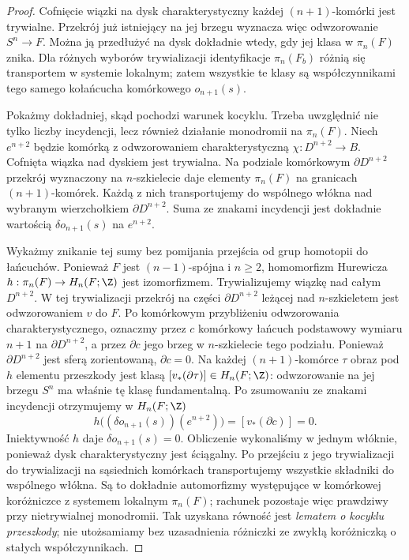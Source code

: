 \begin{proof}
Cofnięcie wiązki na dysk charakterystyczny każdej
$(n+1)$-komórki jest trywialne. Przekrój już istniejący
na jej brzegu wyznacza więc odwzorowanie $S^n\to F$.
Można ją przedłużyć na dysk dokładnie wtedy, gdy
jej klasa w $\pi_n(F)$ znika.
Dla różnych wyborów trywializacji identyfikacje
$\pi_n(F_b)$ różnią się transportem w systemie lokalnym;
zatem wszystkie te klasy są współczynnikami tego samego
kołańcucha komórkowego $o_{n+1}(s)$.

Pokażmy dokładniej, skąd pochodzi warunek kocyklu.
Trzeba uwzględnić nie tylko liczby incydencji,
lecz również działanie monodromii na $\pi_n(F)$.
Niech $e^{n+2}$ będzie komórką z odwzorowaniem
charakterystyczną $\chi:D^{n+2}\to B$.
Cofnięta wiązka nad dyskiem jest trywialna.
Na podziale komórkowym $\partial D^{n+2}$ przekrój
wyznaczony na $n$-szkielecie daje elementy
$\pi_n(F)$ na granicach $(n+1)$-komórek.
Każdą z nich transportujemy do wspólnego włókna
nad wybranym wierzchołkiem $\partial D^{n+2}$.
Suma ze znakami incydencji jest dokładnie wartością
$\delta o_{n+1}(s)$ na $e^{n+2}$.

Wykażmy znikanie tej sumy bez pomijania przejścia
od grup homotopii do łańcuchów. Ponieważ $F$ jest
$(n-1)$-spójna i $n\ge2$, homomorfizm Hurewicza
$h:\pi_n(F)\to H_n(F;\Z)$ jest izomorfizmem.
Trywializujemy wiązkę nad całym $D^{n+2}$.
W tej trywializacji przekrój na części
$\partial D^{n+2}$ leżącej nad $n$-szkieletem
jest odwzorowaniem $v$ do $F$. Po komórkowym przybliżeniu
odwzorowania charakterystycznego, oznaczmy przez $c$
komórkowy łańcuch podstawowy wymiaru $n+1$
na $\partial D^{n+2}$, a przez $\partial c$
jego brzeg w $n$-szkielecie tego podziału.
Ponieważ $\partial D^{n+2}$ jest sferą
zorientowaną, $\partial c=0$. Na każdej
$(n+1)$-komórce $\tau$ obraz pod
$h$ elementu przeszkody jest klasą
$[v_*(\partial\tau)]\in H_n(F;\Z)$:
odwzorowanie na jej brzegu $S^n$ ma właśnie tę
klasę fundamentalną. Po zsumowaniu ze znakami
incydencji otrzymujemy w $H_n(F;\Z)$
\[
 h\bigl((\delta o_{n+1}(s))(e^{n+2})\bigr)
 =[v_*(\partial c)]=0.
\]
Iniektywność $h$ daje $\delta o_{n+1}(s)=0$.
Obliczenie wykonaliśmy w jednym włóknie, ponieważ
dysk charakterystyczny jest ściągalny. Po przejściu
z jego trywializacji do trywializacji na sąsiednich
komórkach transportujemy wszystkie składniki do
wspólnego włókna. Są to dokładnie automorfizmy
występujące w komórkowej koróżniczce z systemem
lokalnym $\mathcal\pi_n(F)$; rachunek pozostaje więc
prawdziwy przy nietrywialnej monodromii. Tak uzyskana
równość jest \emph{lematem o kocyklu przeszkody};
nie utożsamiamy bez uzasadnienia różniczki ze zwykłą
koróżniczką o stałych współczynnikach.


\end{proof}

